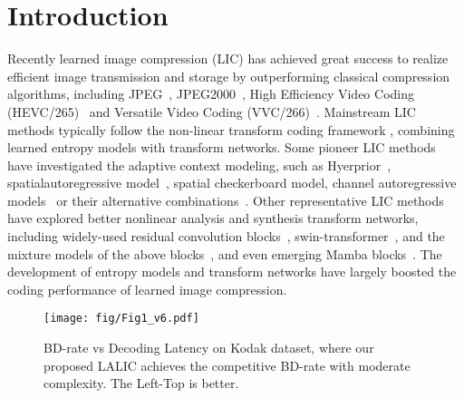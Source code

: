 \section{Introduction}
\label{sec:intro}




Recently learned image compression (LIC) has achieved great success to realize efficient image transmission and storage by outperforming classical compression algorithms, including  JPEG~\cite{Wallace.1992.JPEG}, JPEG2000~\cite{Skodras.2001.JP2K}, High Efficiency Video Coding (HEVC/265)~\cite{Sullivan.2012.HEVC} and Versatile Video Coding (VVC/266)~\cite{Bross.2021.VVC}.
Mainstream LIC methods typically follow the non-linear transform coding framework \cite{Balle.2021.NTC}, combining learned entropy models with transform networks. Some pioneer LIC methods have investigated the adaptive context modeling, such as Hyerprior~\cite{Balle.2021.NTC}, spatialautoregressive model~\cite{Minnen.2018.Joint}, spatial checkerboard model, channel autoregressive models~\cite{Minnen.2020.Charm} or their alternative combinations~\cite{He.2022.ELIC}. Other representative LIC methods have explored better nonlinear analysis and synthesis transform networks, including widely-used residual convolution blocks~\cite{Cheng.2020.LIC}, swin-transformer~\cite{Liu.2021.SwinT}, and the mixture models of the above blocks~\cite{Liu.2023.TCM, Li.2023.FAT}, and even emerging Mamba blocks~\cite{Qin2024MambaVCLV}. 
The development of entropy models and transform networks have largely boosted the coding performance of learned image compression. %


\begin{figure}
  \texttt{[image: fig/Fig1\_v6.pdf]}
  \caption{BD-rate vs Decoding Latency on Kodak dataset, where our proposed LALIC achieves the competitive BD-rate with moderate complexity. The Left-Top is better.} 
  \label{fig:teaser}
\end{figure}



